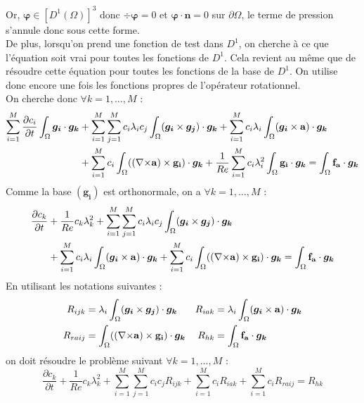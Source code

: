 Or, $\bm{\varphi}\in [D^1(\Omega)]^3$ donc $\div\bm{\varphi}=0$ et $\bm{\varphi}\cdot \mathbf{n}=0$ sur $\partial\Omega$, le terme de pression s'annule donc sous cette forme.\\
De plus, lorsqu'on prend une fonction de test dans $D^1$, on cherche à ce que l'équation soit vrai pour toutes les fonctions de $D^1$. Cela revient au même que de résoudre cette équation pour toutes les fonctions de la base de $D^1$. On utilise donc encore une fois les fonctions propres de l'opérateur rotationnel.\\
On cherche donc $\forall k=1,\dots,M$ :
\begin{align*}
\sum_{i=1}^M\frac{\partial c_i}{\partial t}\int_\Omega\bm{g_i}\cdot\bm{g_k} &+ \sum_{i=1}^M\sum_{j=1}^Mc_i\lambda_ic_j\int_\Omega(\bm{g_i}\times \bm{g_j})\cdot\bm{g_k} + \sum_{i=1}^Mc_i\lambda_i\int_\Omega(\bm{g_i}\times \mathbf{a})\cdot\bm{g_k}\\
& +  \sum_{i=1}^Mc_i\int_\Omega(({\nabla\times}\mathbf{a})\times \mathbf{g_i})\cdot\bm{g_k} +\frac{1}{Re}\sum_{i=1}^Mc_i\lambda_i^2\int_\Omega\mathbf{g_i}\cdot\bm{g_k} = \int_\Omega\mathbf{f_a}\cdot\bm{g_k}\\
\end{align*}
Comme la base $(\bm{g_i})$ est orthonormale, on a $\forall k=1,\dots,M$ :
\begin{align*}
\frac{\partial c_k}{\partial t} &+ \frac{1}{Re}c_k\lambda_k^2 + \sum_{i=1}^M\sum_{j=1}^Mc_i\lambda_ic_j\int_\Omega(\bm{g_i}\times \bm{g_j})\cdot\bm{g_k}\\
& + \sum_{i=1}^Mc_i\lambda_i\int_\Omega(\bm{g_i}\times \mathbf{a})\cdot\bm{g_k} +  \sum_{i=1}^Mc_i\int_\Omega(({\nabla\times}\mathbf{a})\times \mathbf{g_i})\cdot\bm{g_k} = \int_\Omega\mathbf{f_a}\cdot\bm{g_k}\\
\end{align*}
En utilisant les notations suivantes :
\begin{align*}
R_{ijk} &= \lambda_i\int_\Omega(\bm{g_i}\times \bm{g_j})\cdot\bm{g_k} & R_{iak} &= \lambda_i\int_\Omega(\bm{g_i}\times \mathbf{a})\cdot\bm{g_k}\\
R_{raij} &= \int_\Omega(({\nabla\times}\mathbf{a})\times \mathbf{g_i})\cdot\bm{g_k} & R_{hk} &= \int_\Omega\mathbf{f_a}\cdot\bm{g_k}
\end{align*}
on doit résoudre le problème suivant $\forall k=1,\dots,M$ :
\begin{equation}\label{fvc}
\frac{\partial c_k}{\partial t} + \frac{1}{Re}c_k\lambda_k^2 + \sum_{i=1}^M\sum_{j=1}^Mc_ic_jR_{ijk} + \sum_{i=1}^Mc_iR_{iak} + \sum_{i=1}^Mc_iR_{raij} = R_{hk}
\end{equation}

